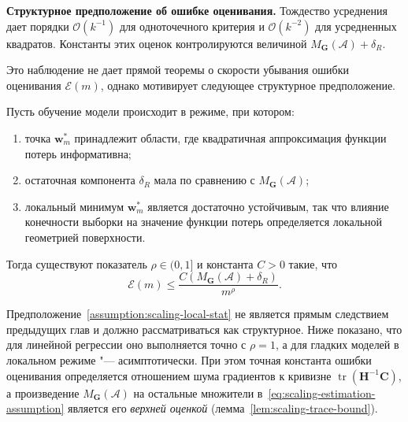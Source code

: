 \textbf{Структурное предположение об ошибке оценивания.} Тождество усреднения дает порядки $\mathcal O(k^{-1})$ для одноточечного критерия и $\mathcal O(k^{-2})$ для усредненных квадратов. Константы этих оценок контролируются величиной $M_{\mathbf G}(\mathcal A)+\delta_R$.

Это наблюдение не дает прямой теоремы о скорости убывания ошибки оценивания $\mathcal E(m)$, однако мотивирует следующее структурное предположение.

\begin{assumption}
    \label{assumption:scaling-local-stat}
    Пусть обучение модели происходит в режиме, при котором:
    \begin{enumerate}
        \item точка $\mathbf w_m^*$ принадлежит области, где квадратичная аппроксимация функции потерь информативна;
        \item остаточная компонента $\delta_R$ мала по сравнению с $M_{\mathbf G}(\mathcal A)$;
        \item локальный минимум $\mathbf w_m^*$ является достаточно устойчивым, так что влияние конечности выборки на значение функции потерь определяется локальной геометрией поверхности.
    \end{enumerate}
    Тогда существуют показатель $\rho \in (0, 1]$ и константа $C>0$ такие, что
    \begin{equation}
        \label{eq:scaling-estimation-assumption}
        \mathcal E(m)
        \le
        \frac{C\left(M_{\mathbf G}(\mathcal A)+\delta_R\right)}{m^{\rho}}.
    \end{equation}
\end{assumption}

\begin{remark}
    Предположение~\ref{assumption:scaling-local-stat} не является прямым следствием предыдущих глав и должно рассматриваться как структурное. Ниже показано, что для линейной регрессии оно выполняется точно с $\rho = 1$, а для гладких моделей в локальном режиме "--- асимптотически. При этом точная константа ошибки оценивания определяется отношением шума градиентов к кривизне $\operatorname{tr}(\mathbf H^{-1}\mathbf C)$, а произведение $M_{\mathbf G}(\mathcal A)$ на остальные множители в~\eqref{eq:scaling-estimation-assumption} является его \emph{верхней оценкой} (лемма~\ref{lem:scaling-trace-bound}).
\end{remark}

